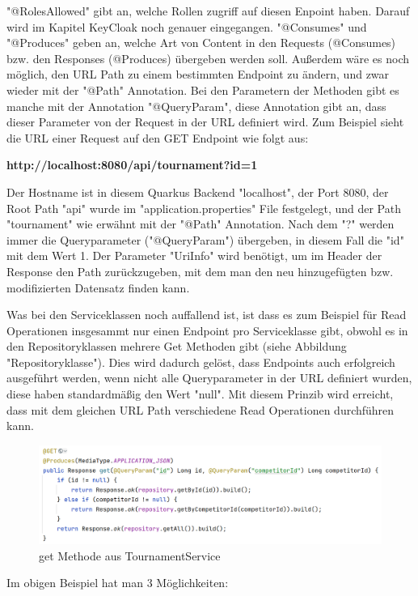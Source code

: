"@RolesAllowed" gibt an, welche Rollen zugriff auf diesen Enpoint haben. Darauf wird im Kapitel KeyCloak noch genauer eingegangen. "@Consumes" und "@Produces" geben an, 
welche Art von Content in den Requests (@Consumes) bzw. den Responses (@Produces) übergeben werden soll. Außerdem wäre es noch möglich, den URL Path zu einem bestimmten Endpoint zu ändern, 
und zwar wieder mit der "@Path" Annotation. Bei den Parametern der Methoden gibt es manche mit der Annotation "@QueryParam", diese Annotation gibt an, dass dieser Parameter von der 
Request in der URL definiert wird. Zum Beispiel sieht die URL einer Request auf den GET Endpoint wie folgt aus:

\textbf{http://localhost:8080/api/tournament?id=1} 

Der Hostname ist in diesem Quarkus Backend "localhost", der Port 8080, der Root Path "api" wurde im "application.properties" File festgelegt, und der Path "tournament" wie erwähnt mit der "@Path" Annotation. 
Nach dem "?" werden immer die Queryparameter ("@QueryParam") übergeben, in diesem Fall die "id" mit dem Wert 1. Der Parameter "UriInfo" wird benötigt, um im Header der Response den Path zurückzugeben, 
mit dem man den neu hinzugefügten bzw. modifizierten Datensatz finden kann.

Was bei den Serviceklassen noch auffallend ist, ist dass es zum Beispiel für Read Operationen insgesammt nur einen Endpoint pro Serviceklasse gibt, obwohl es in den Repositoryklassen mehrere Get Methoden gibt (siehe Abbildung "Repositoryklasse").
Dies wird dadurch gelöst, dass Endpoints auch erfolgreich ausgeführt werden, wenn nicht alle Queryparameter in der URL definiert wurden, diese haben standardmäßig den Wert "null". Mit diesem Prinzib wird erreicht, dass mit dem gleichen URL Path 
verschiedene Read Operationen durchführen kann.

\begin{figure}[H]
    \includegraphics[scale=0.5]{pics/backend/service_get_function.png}
    \caption{get Methode aus TournamentService}
\end{figure}

Im obigen Beispiel hat man 3 Möglichkeiten:

